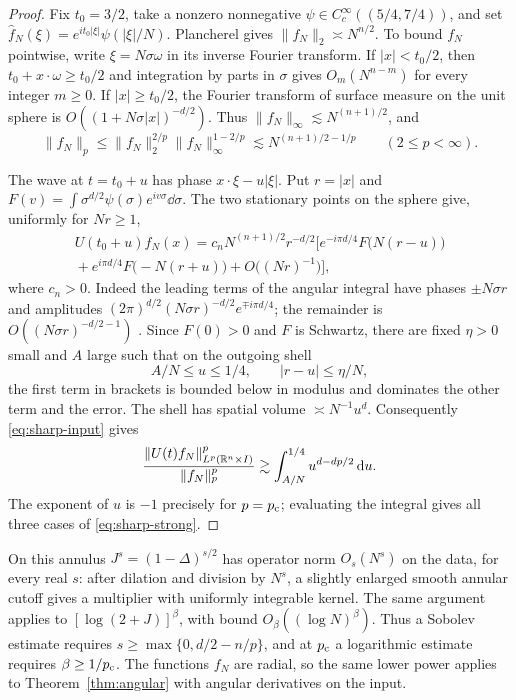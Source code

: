 \begin{proof}
Fix $t_0=3/2$, take a nonzero nonnegative
$\psi\in C_c^\infty((5/4,7/4))$, and set
$\widehat f_N(\xi)=e^{it_0|\xi|}\psi(|\xi|/N)$.
Plancherel gives $\|f_N\|_2\asymp N^{n/2}$. To bound $f_N$ pointwise,
write $\xi=N\sigma\omega$ in its inverse Fourier transform. If
$|x|<t_0/2$, then $t_0+x\cdot\omega\ge t_0/2$ and integration by parts
in $\sigma$ gives $O_m(N^{n-m})$ for every integer $m\ge0$.
If $|x|\ge t_0/2$, the Fourier transform of surface measure on the
unit sphere is $O((1+N\sigma|x|)^{-d/2})$. Thus
$\|f_N\|_\infty\lesssim N^{(n+1)/2}$, and
\begin{equation}\label{eq:sharp-input}
 \|f_N\|_p\le\|f_N\|_2^{2/p}\|f_N\|_\infty^{1-2/p}
       \lesssim N^{(n+1)/2-1/p}\qquad (2\le p<\infty).
\end{equation}

The wave at $t=t_0+u$ has phase $x\cdot\xi-u|\xi|$. Put $r=|x|$ and
$F(v)=\int \sigma^{d/2}\psi(\sigma)e^{iv\sigma}\dd\sigma$.
The two stationary points on the sphere give, uniformly for $Nr\ge1$,
\begin{multline}\label{eq:sharp-phases}
 U(t_0+u)f_N(x)=c_n N^{(n+1)/2}r^{-d/2}
 \Big[e^{-i\pi d/4}F\big(N(r-u)\big)\\
 {}+e^{i\pi d/4}F\big(-N(r+u)\big)+O\big((Nr)^{-1}\big)\Big],
\end{multline}
where $c_n>0$. Indeed the leading terms of the angular integral have
phases $\pm N\sigma r$ and amplitudes
$(2\pi)^{d/2}(N\sigma r)^{-d/2}e^{\mp i\pi d/4}$; the remainder is
$O((N\sigma r)^{-d/2-1})$ \cite[Chapter~VIII]{Stein1993}.
Since $F(0)>0$ and $F$ is Schwartz, there are fixed $\eta>0$ small
and $A$ large such that on the outgoing shell
\[
 A/N\le u\le1/4,\qquad |r-u|\le\eta/N,
\]
the first term in brackets is bounded below in modulus and dominates
the other term and the error. The shell has spatial volume
$\asymp N^{-1}u^d$. Consequently \eqref{eq:sharp-input} gives
\[
 \frac{\|U(t)f_N\|_{L^p(\mathbb R^n\times I)}^p}{\|f_N\|_p^p}
 \gtrsim \int_{A/N}^{1/4}u^{d-dp/2}\,\mathrm d u .
\]
The exponent of $u$ is $-1$ precisely for $p=p_{\mathrm c}$; evaluating the
integral gives all three cases of \eqref{eq:sharp-strong}.
\end{proof}

On this annulus $J^s=(1-\Delta)^{s/2}$ has operator norm $O_s(N^s)$
on the data, for every real $s$: after dilation and division by $N^s$,
a slightly enlarged smooth annular cutoff gives a multiplier with
uniformly integrable kernel. The same argument applies to
$[\log(2+J)]^\beta$, with bound $O_\beta((\log N)^\beta)$.
Thus a Sobolev estimate requires $s\ge\max\{0,d/2-n/p\}$, and at
$p_{\mathrm c}$ a logarithmic estimate requires $\beta\ge1/p_{\mathrm c}$.
The functions $f_N$ are radial, so the same lower power applies to
Theorem~\ref{thm:angular} with angular derivatives on the input.

